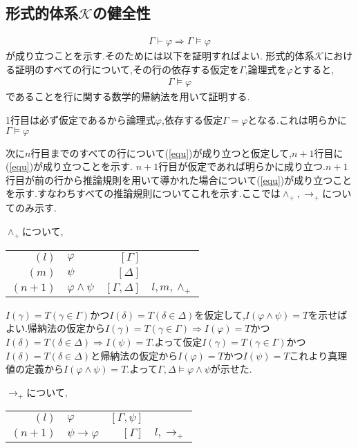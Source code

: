 \documentclass[10pt,b5paper,papersize,dvipdfmx]{jsbook}
\begin{document}
\subsection{形式的体系\texorpdfstring{$\mathcal K$}{K}の健全性}
\begin{align}
\Gamma \vdash \varphi \Rightarrow \Gamma \models \varphi
\end{align}
が成り立つことを示す.そのためには以下を証明すればよい.
形式的体系$\mathcal K$における証明のすべての行について,その行の依存する仮定を$\Gamma$,論理式を$\varphi$とすると,
\begin{align}
\label{equ} \Gamma \models \varphi
\end{align}
であることを行に関する数学的帰納法を用いて証明する.\par
1行目は必ず仮定であるから論理式$\varphi$,依存する仮定$\Gamma = \varphi$となる.これは明らかに$\Gamma \models \varphi$ \par
次に$n$行目までのすべての行について(\ref{equ})が成り立つと仮定して,$n+1$行目に(\ref{equ})が成り立つことを示す.
$n+1$行目が仮定であれば明らかに成り立つ.$n+1$行目が前の行から推論規則を用いて導かれた場合について(\ref{equ})が成り立つことを示す.すなわちすべての推論規則についてこれを示す.ここでは$\land_+,\to_+$についてのみ示す.\par
$\land_+$について,
\begin{table}[H]
\begin{tabular}{rlrl}
$(l)$&$\varphi$&$[\Gamma]$& \\
$(m)$&$\psi$&$[\Delta]$& \\
$(n+1)$&$\varphi \land \psi$&$[\Gamma,\Delta]$&$l,m,\land_+$
\end{tabular}
\end{table}
$I(\gamma)=T(\gamma \in \Gamma)$かつ$I(\delta)=T(\delta \in \Delta)$を仮定して,$I(\varphi \land \psi)=T$を示せばよい.帰納法の仮定から$I(\gamma)=T(\gamma \in \Gamma)\Rightarrow I(\varphi)=T$かつ$I(\delta)=T(\delta \in \Delta)\Rightarrow I(\psi)=T$.よって仮定$I(\gamma)=T(\gamma \in \Gamma)$かつ$I(\delta)=T(\delta \in \Delta)$と帰納法の仮定から$I(\varphi)=T$かつ$I(\psi)=T$これより真理値の定義から$I(\varphi \land \psi)=T$.よって$\Gamma,\Delta \models \varphi \land \psi$が示せた.\par
$\to_+$について,
\begin{table}[H]
\begin{tabular}{rlrl}
$(l)$&$\varphi$&$[\Gamma,\psi]$& \\
$(n+1)$&$\psi \to \varphi$&$[\Gamma]$&$l,\to_+$ \\
\end{tabular}
\end{table}
\end{document}
